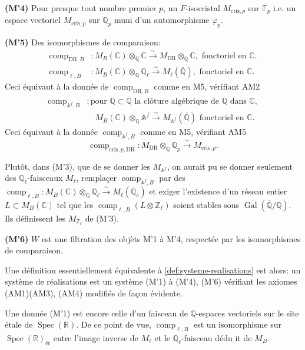 \documentclass[12pt,a4paper]{article}
\theoremstyle{plain}
\theoremstyle{definition}
\theoremstyle{remark}
\DeclareMathOperator{\Spec}{Spec}
\DeclareMathOperator{\Gal}{Gal}
\providecommand{\Gal}{\operatorname{Gal}}
\providecommand{\Spec}{\operatorname{Spec}}
\providecommand{\DR}{\mathrm{DR}}
\providecommand{\cris}{\mathrm{cris}}
\providecommand{\comp}{\operatorname{comp}}
\begin{document}
\textbf{(M'4)} Pour presque tout nombre premier $p$, un $F$-isocristal $M_{\cris,p}$ sur
$\mathbb{F}_p$ i.e. un espace vectoriel $M_{\cris,p}$ sur $\mathbb{Q}_p$ muni d'un
automorphisme $\varphi_p$.

\textbf{(M'5)} Des isomorphismes de comparaison:
\begin{align*}
\comp_{\DR,B} &: M_B(\mathbb{C}) \otimes_{\mathbb{Q}} \mathbb{C} \xrightarrow{\sim}
M_{\DR} \otimes_{\mathbb{Q}} \mathbb{C}, \text{ fonctoriel en } \mathbb{C}.\\
\comp_{\ell,B} &: M_B(\mathbb{C}) \otimes_{\mathbb{Q}} \mathbb{Q}_\ell \xrightarrow{\sim}
M_\ell(\overline{\mathbb{Q}}), \text{ fonctoriel en } \mathbb{C}.
\end{align*}
Ceci \'equivaut \`a la donn\'ee de $\comp_{\DR,B}$ comme en M5, v\'erifiant AM2
\begin{align*}
\comp_{\mathbb{A}^f,B} &: \text{pour } \mathbb{Q} \subset \overline{\mathbb{Q}}
\text{ la cl\^oture alg\'ebrique de } \mathbb{Q} \text{ dans } \mathbb{C},\\
&\quad M_B(\mathbb{C}) \otimes_{\mathbb{Q}} \mathbb{A}^f \xrightarrow{\sim}
M_{\mathbb{A}^f}(\overline{\mathbb{Q}}) \text{ fonctoriel en } \mathbb{C}.
\end{align*}
Ceci \'equivaut \`a la donn\'ee $\comp_{\mathbb{A}^f,B}$ comme en M5, v\'erifiant AM5
\[
\comp_{\cris,p,\DR}: M_{\DR} \otimes_{\mathbb{Q}} \mathbb{Q}_p \xrightarrow{\sim}
M_{\cris,p}.
\]

Plut\^ot, dans (M'3), que de se donner les $M_{\mathbb{A}^f}$, on aurait pu se donner
seulement des $\mathbb{Q}_\ell$-faisceaux $M_\ell$, rempla\c{c}er
$\comp_{\mathbb{A}^f,B}$ par des $\comp_{\ell,B}: M_B(\mathbb{C}) \otimes_{\mathbb{Q}}
\mathbb{Q}_\ell \xrightarrow{\sim} M_\ell(\overline{\mathbb{Q}}_c)$ et exiger l'existence d'un
r\'eseau entier $L \subset M_B(\mathbb{C})$ tel que les $\comp_{\ell,B}(L \otimes
\mathbb{Z}_\ell)$ soient stables sous $\Gal(\overline{\mathbb{Q}}/\mathbb{Q})$. Ils d\'efinissent
les $M_{\mathbb{Z}_\ell}$ de (M'3).

\textbf{(M'6)} $W$ est une filtration des obj\`ets M'1 \`a M'4, respect\'ee par les
isomorphismes de comparaison.

Une d\'efinition essentiellement \'equivalente \`a \ref{def:systeme-realisations} est alors:
un syst\`eme de r\'ealisations est un syst\`eme (M'1) \`a (M'4), (M'6) v\'erifiant les
axiomes (AM1)(AM3), (AM4) modifi\'es de fa\c{c}on \'evidente.

Une donn\'ee (M'1) est encore celle d'un faisceau de $\mathbb{Q}$-espaces vectoriels sur le
site \'etale de $\Spec(\mathbb{R})$. De ce point de vue, $\comp_{\ell,B}$ est un
isomorphisme sur $\Spec(\mathbb{R})_\text{\'et}$ entre l'image inverse de $M_\ell$ et le
$\mathbb{Q}_\ell$-faisceau d\'edu it de $M_B$.
\end{document}
